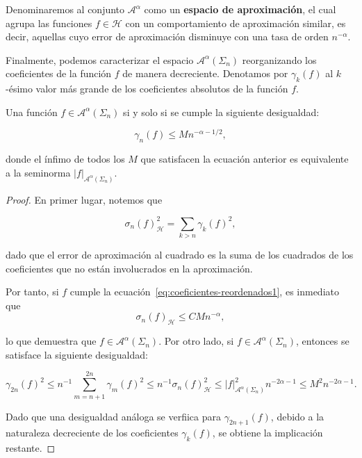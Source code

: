 Denominaremos al conjunto $\mathcal{A}^{\alpha}$ como un \textbf{espacio de aproximación}, el cual agrupa las funciones $f \in \mathcal{H}$ con un comportamiento de aproximación similar, es decir, aquellas cuyo error de aproximación disminuye con una tasa de orden $n^{-\alpha}$.\newline

Finalmente, podemos caracterizar el espacio $\mathcal{A}^{\alpha}(\Sigma_n)$ reorganizando los coeficientes de la función $f$ de manera decreciente. Denotamos por $\gamma_k(f)$ al $k$-ésimo valor más grande de los coeficientes absolutos de la función $f$. 

\begin{teorema}
    Una función $f \in \mathcal{A}^{\alpha}(\Sigma_n)$ si y solo si se cumple la siguiente desigualdad:

    \begin{equation}\label{eq:coeficientes-reordenados1}
        \gamma_n(f) \leq M n^{-\alpha - 1/2},
    \end{equation}

    donde el ínfimo de todos los $M$ que satisfacen la ecuación anterior es equivalente a la seminorma $|f|_{\mathcal{A}^{\alpha}(\Sigma_n)}$.
\end{teorema}

\begin{proof}
    En primer lugar, notemos que

    \[
        \sigma_n(f)^2_{\mathcal{H}} = \sum_{k>n} \gamma_k(f)^2,
    \]

    dado que el error de aproximación al cuadrado es la suma de los cuadrados de los coeficientes que no están involucrados en la aproximación.\newline

    Por tanto, si $f$ cumple la ecuación~\eqref{eq:coeficientes-reordenados1}, es inmediato que
    \[
        \sigma_n(f)_{\mathcal{H}} \leq C M n^{-\alpha},
    \]

    lo que demuestra que $f \in \mathcal{A}^{\alpha}(\Sigma_n)$. Por otro lado, si $f \in \mathcal{A}^{\alpha}(\Sigma_n)$, entonces se satisface la siguiente desigualdad:

    \[
        \gamma_{2n}(f)^2 \leq n^{-1} \sum_{m=n+1}^{2n} \gamma_m(f)^2 \leq n^{-1} \sigma_n(f)_{\mathcal{H}}^2 \leq |f|_{\mathcal{A}^{\alpha}(\Sigma_n)}^2 n^{-2\alpha - 1} \leq M^2 n^{-2\alpha - 1}.
    \]

    Dado que una desigualdad análoga se verfiica para $\gamma_{2n+1}(f)$, debido a la naturaleza decreciente de los coeficientes $\gamma_k(f)$, se obtiene la implicación restante.\newline
\end{proof}

